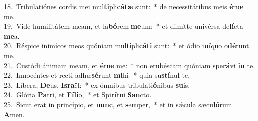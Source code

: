 {18.~}Tribulatiónes cordis mei mul\textbf{ti}pli\textbf{cá}\textbf{tæ} sunt:~* de necessitátibus meis \textbf{é}ru\textbf{e} me.\\
{19.~}Vide humilitátem meam, et la\textbf{bó}rem \textbf{me}um:~* et dimítte univérsa de\textbf{lí}cta \textbf{me}a.\\
{20.~}Réspice inimícos meos quóniam mul\textbf{ti}pli\textbf{cá}\textbf{ti} sunt:~* et ódio i\textbf{ní}quo o\textbf{dé}runt me.\\
{21.~}Custódi ánimam meam, et \textbf{é}ru\textbf{e} me:~* non erubéscam quóniam spe\textbf{rá}vi \textbf{in} te.\\
{22.~}Innocéntes et recti adhæ\textbf{sé}runt \textbf{mi}hi:~* quia su\textbf{stí}nu\textbf{i} te.\\
{23.~}Líbera, \textbf{De}us, \textbf{Is}\textbf{ra}ël:~* ex ómnibus tribulati\textbf{ó}nibus \textbf{su}is.\\
{24.~}Glória \textbf{Pa}tri, et \textbf{Fí}\textbf{li}o,~* et Spi\textbf{rí}tui \textbf{San}cto.\\
{25.~}Sicut erat in princípio, et \textbf{nunc}, et \textbf{sem}per,~* et in sǽcula sæcu\textbf{ló}rum. \textbf{A}men.\\
